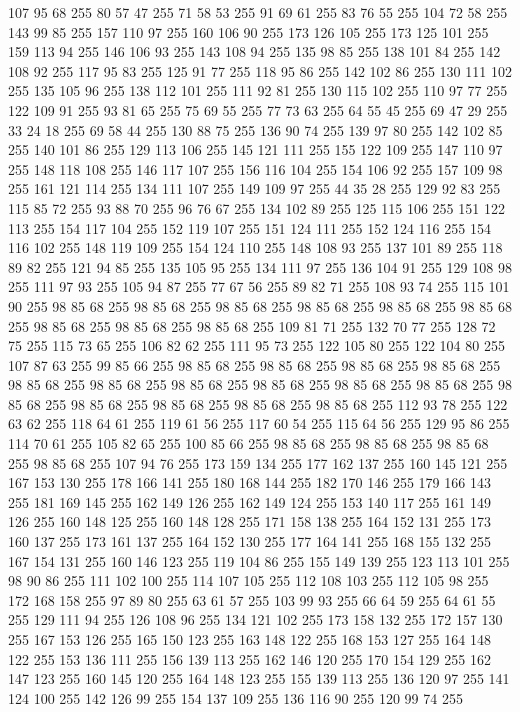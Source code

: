 107 95 68 255 80 57 47 255 71 58 53 255 91 69 61 255 83 76 55 255 104 72 58 255 143 99 85 255 157 110 97 255 160 106 90 255 173 126 105 255 173 125 101 255 159 113 94 255 146 106 93 255 143 108 94 255 135 98 85 255 138 101 84 255 142 108 92 255 117 95 83 255 125 91 77 255 118 95 86 255 142 102 86 255 130 111 102 255 135 105 96 255 138 112 101 255 111 92 81 255 130 115 102 255 110 97 77 255 122 109 91 255 93 81 65 255 75 69 55 255 77 73 63 255 64 55 45 255 69 47 29 255 33 24 18 255 69 58 44 255 130 88 75 255 136 90 74 255 139 97 80 255 142 102 85 255 140 101 86 255 129 113 106 255 145 121 111 255 155 122 109 255 147 110 97 255 148 118 108 255 146 117 107 255 156 116 104 255 154 106 92 255 157 109 98 255 161 121 114 255 134 111 107 255 149 109 97 255 44 35 28 255 129 92 83 255 115 85 72 255 93 88 70 255 96 76 67 255 134 102 89 255 125 115 106 255 151 122 113 255 154 117 104 255 152 119 107 255 151 124 111 255 152 124 116 255
154 116 102 255 148 119 109 255 154 124 110 255 148 108 93 255 137 101 89 255 118 89 82 255 121 94 85 255 135 105 95 255 134 111 97 255 136 104 91 255 129 108 98 255 111 97 93 255 105 94 87 255 77 67 56 255 89 82 71 255 108 93 74 255 115 101 90 255 98 85 68 255 98 85 68 255 98 85 68 255 98 85 68 255 98 85 68 255 98 85 68 255 98 85 68 255 98 85 68 255 98 85 68 255 109 81 71 255 132 70 77 255 128 72 75 255 115 73 65 255 106 82 62 255 111 95 73 255 122 105 80 255 122 104 80 255 107 87 63 255 99 85 66 255 98 85 68 255 98 85 68 255 98 85 68 255 98 85 68 255 98 85 68 255 98 85 68 255 98 85 68 255 98 85 68 255 98 85 68 255 98 85 68 255 98 85 68 255 98 85 68 255 98 85 68 255 98 85 68 255 98 85 68 255 112 93 78 255 122 63 62 255 118 64 61 255 119 61 56 255 117 60 54 255 115 64 56 255 129 95 86 255 114 70 61 255 105 82 65 255 100 85 66 255 98 85 68 255 98 85 68 255 98 85 68 255
98 85 68 255 107 94 76 255 173 159 134 255 177 162 137 255 160 145 121 255 167 153 130 255 178 166 141 255 180 168 144 255 182 170 146 255 179 166 143 255 181 169 145 255 162 149 126 255 162 149 124 255 153 140 117 255 161 149 126 255 160 148 125 255 160 148 128 255 171 158 138 255 164 152 131 255 173 160 137 255 173 161 137 255 164 152 130 255 177 164 141 255 168 155 132 255 167 154 131 255 160 146 123 255 119 104 86 255 155 149 139 255 123 113 101 255 98 90 86 255 111 102 100 255 114 107 105 255 112 108 103 255 112 105 98 255 172 168 158 255 97 89 80 255 63 61 57 255 103 99 93 255 66 64 59 255 64 61 55 255 129 111 94 255 126 108 96 255 134 121 102 255 173 158 132 255 172 157 130 255 167 153 126 255 165 150 123 255 163 148 122 255 168 153 127 255 164 148 122 255 153 136 111 255 156 139 113 255 162 146 120 255 170 154 129 255 162 147 123 255 160 145 120 255 164 148 123 255 155 139 113 255 136 120 97 255 141 124 100 255 142 126 99 255 154 137 109 255 136 116 90 255 120 99 74 255
